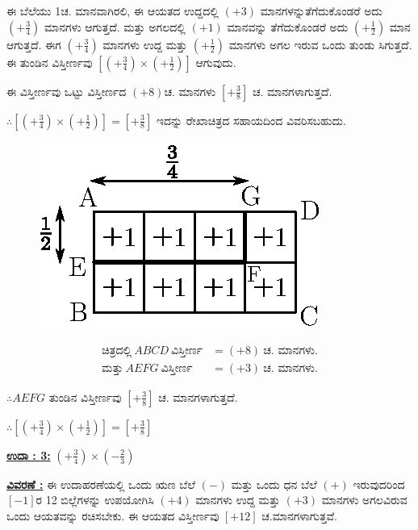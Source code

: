 ಈ ಬೆಲೆಯು 1ಚ. ಮಾನವಾಗಿರಲಿ, ಈ ಆಯತದ ಉದ್ದದಲ್ಲಿ $(+3)$ ಮಾನಗಳನ್ನು\break  ತೆಗೆದುಕೊಂಡರೆ ಅದು $\left(+\frac{3}{4} \right)$ ಮಾನಗಳು ಆಗುತ್ತದೆ. ಮತ್ತು ಅಗಲದಲ್ಲಿ $(+1)$ ಮಾನವನ್ನು ತೆಗೆದುಕೊಂಡರೆ ಅದು $\left(+\frac{1}{2}\right)$ ಮಾನ ಆಗುತ್ತದೆ. ಈಗ $\left(+\frac{3}{4} \right)$ ಮಾನಗಳು ಉದ್ದ ಮತ್ತು $\left(+\frac{1}{2} \right)$ ಮಾನಗಳು ಅಗಲ ಇರುವ ಒಂದು ತುಂಡು ಸಿಗುತ್ತದೆ. ಈ ತುಂಡಿನ ವಿಸ್ತೀರ್ಣವು $\left[\left(+\frac{3}{4}\right) \times \left(+\frac{1}{2}\right) \right]$ ಆಗುವುದು. 
  
ಈ ವಿಸ್ತೀರ್ಣವು ಒಟ್ಟು ವಿಸ್ತೀರ್ಣದ $(+8)$ಚ. ಮಾನಗಳು $\left[+\frac{3}{8}\right]$ ಚ. ಮಾನಗಳಾಗುತ್ತದೆ.
  
$\therefore \left[\left(+\frac{3}{4}\right) \times \left(+\frac{1}{2}\right) \right] = \left[+\frac{3}{8}\right]$ ಇದನ್ನು ರೇಖಾಚಿತ್ರದ ಸಹಾಯದಿಂದ ವಿವರಿಸ\-ಬಹುದು. 
\begin{figure}[H]
\centering
\includegraphics[scale=0.8]{src/figure/chap3/fig3-24b.eps}
\end{figure}
\vskip -1.2cm
\begin{align*}
\text{ಚಿತ್ರದಲ್ಲಿ}~ ABCD~ \text{ವಿಸ್ತೀರ್ಣ} & = (+8)~ \text{ಚ. ಮಾನಗಳು.}\\
\text{ಮತ್ತು}~ AEFG~ \text{ವಿಸ್ತೀರ್ಣ} & = (+3)~ \text{ಚ. ಮಾನಗಳು.}
\end{align*}

$\therefore AEFG$ ತುಂಡಿನ ವಿಸ್ತೀರ್ಣವು $\left[+\frac{3}{8}\right]$ ಚ. ಮಾನಗಳಾಗುತ್ತದೆ. 

$\therefore \left[\left(+\frac{3}{4}\right) \times \left(+\frac{1}{2}\right)\right] = \left[+\frac{3}{8}\right]$


\vspace{.2cm}

\noindent
{\textbf{\underline{ಉದಾ : 3:}}} $\left(+\frac{3}{4} \right) \times \left(-\frac{2}{3} \right)$

\vspace{.2cm}

\noindent
{\textbf{\underline{ವಿವರಣೆ :}}} ಈ ಉದಾಹರಣೆಯಲ್ಲಿ ಒಂದು ಋಣ ಬೆಲೆ $(-)$ ಮತ್ತು ಒಂದು ಧನ ಬೆಲೆ $(+)$ ಇರುವುದರಿಂದ $[-1]$ರ 12 ಬಿಲ್ಲೆಗಳನ್ನು ಉಪಯೋಗಿಸಿ $(+4)$ ಮಾನಗಳು ಉದ್ದ ಮತ್ತು $(+3)$ ಮಾನಗಳು ಅಗಲವಿರುವ ಒಂದು ಆಯತವನ್ನು ರಚಿಸಬೇಕು. ಈ ಆಯತದ \hbox{ವಿಸ್ತೀರ್ಣವು} $[+12]$ ಚ.ಮಾನಗಳಾಗುತ್ತವೆ.

